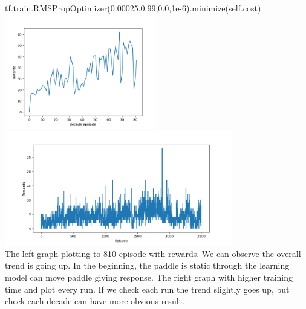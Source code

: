 \documentclass[a4paper, 11pt]{article}
\begin{document}
tf.train.RMSPropOptimizer(0.00025,0.99,0.0,1e-6).minimize(self.cost)\\
\includegraphics[height = 5cm]{81.png}
\includegraphics[height = 5cm]{longer.png}\\
The left graph plotting to 810 episode with rewards. We can observe the overall trend is going up. In the beginning, the paddle is static through the learning model can move paddle giving response. The right graph with higher training time and plot every run. If we check each run the trend slightly goes up, but check each decade can have more obvious result.
\end{document}
